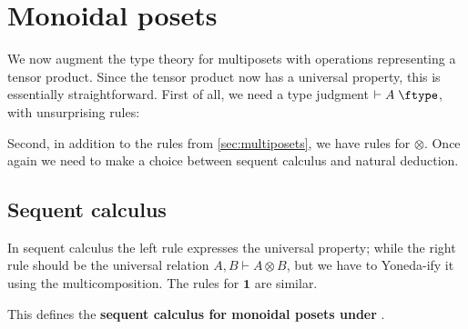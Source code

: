 \documentclass{book}
\let\types\vdash
\def\type{\;\ftype}
\def\one{\mathbf{1}}
\let\tensor\otimes
\def\tensorL{\mathord{\tensor}L}
\def\tensorR{\mathord{\tensor}R}
\begin{document}
\section{Monoidal posets}
\label{sec:monpos}

We now augment the type theory for multiposets with operations representing a tensor product.
Since the tensor product now has a universal property, this is essentially straightforward.
First of all, we need a type judgment $\types A\type$, with unsurprising rules:

Second, in addition to the rules from \cref{sec:multiposets}, we have rules for $\tensor$.
Once again we need to make a choice between sequent calculus and natural deduction.

\subsection{Sequent calculus}
\label{sec:seqcalc-monpos}

In sequent calculus the left rule expresses the universal property; while
the right rule should be the universal relation $A,B\types A\tensor B$, but we have to Yoneda-ify it using the multicomposition.
The rules for $\one$ are similar.
This defines the \textbf{sequent calculus for monoidal posets under \cG}.
\end{document}
